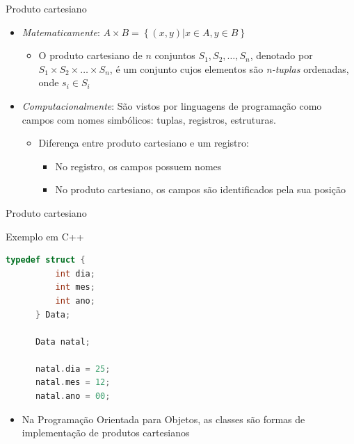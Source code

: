 \documentclass[handout]{beamer}
\begin{document}
\begin{frame}{Produto cartesiano}
		\begin{itemize}
			\item \textit{Matematicamente}: $A \times B = \left\{ (x, y) | x \in A, y \in B \right\}$
				\begin{itemize}
					\item O produto cartesiano de $n$ conjuntos $S_1, S_2, \ldots, S_n$,
				denotado por $S_1 \times S_2 \times \ldots \times S_n$, é um conjunto cujos elementos são \textit{n-tuplas} ordenadas, onde $s_i \in S_i$
				\end{itemize}

			\item \textit{Computacionalmente}: São vistos por linguagens de programação como campos com nomes simbólicos: tuplas, registros, estruturas.
				\begin{itemize}
					\item Diferença entre produto cartesiano e um registro:
					\begin{itemize}
						\item No registro, os campos possuem nomes
						\item No produto cartesiano, os campos são identificados pela sua posição
					\end{itemize}
				\end{itemize}
		\end{itemize}
 \end{frame}

\begin{frame}[fragile]{Produto cartesiano}

\begin{block}{Exemplo em C++ }
	\begin{lstlisting}[language=C,numbers=none]
      typedef struct {
          int dia;
          int mes;
          int ano;
      } Data;

      Data natal;

      natal.dia = 25;
      natal.mes = 12;
      natal.ano = 00;
	\end{lstlisting}
\end{block}

\begin{itemize}
	\item Na Programação Orientada para Objetos, as classes são formas de implementação de produtos cartesianos
\end{itemize}

\end{frame}
\end{document}

